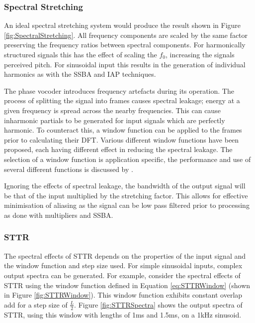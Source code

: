 		\subsubsection*{Spectral Stretching}
			An ideal spectral stretching system would produce the result shown in Figure
			\ref{fig:SpectralStretching}. All frequency components are scaled by the same factor preserving the
			frequency ratios between spectral components. For harmonically structured signals this has the
			effect of scaling the $f_{0}$, increasing the signals perceived pitch. For sinusoidal input this
			results in the generation of individual harmonics as with the SSBA and IAP techniques.
			
			The phase vocoder introduces frequency artefacts during its operation. The process of splitting the
			signal into frames causes spectral leakage; energy at a given frequency is spread across the nearby
			frequencies. This can cause inharmonic partials to be generated for input signals which are
			perfectly harmonic. To counteract this, a window function can be applied to the frames prior to
			calculating their DFT. Various different window functions have been proposed, each having different
			effect in reducing the spectral leakage. The selection of a window function is application
			specific, the performance and use of several different functions is discussed by
			\citet{harris1978on}.
			
			Ignoring the effects of spectral leakage, the bandwidth of the output signal will be that of the
			input multiplied by the stretching factor. This allows for effective minimisation of aliasing as
			the signal can be low pass filtered prior to processing as done with multipliers and SSBA.
		
		\subsubsection*{STTR}
			The spectral effects of STTR depends on the properties of the input signal and the window function
			and step size used. For simple sinusoidal inputs, complex output spectra can be generated. For
			example, consider the spectral effects of STTR using the window function defined in Equation
			\ref{eq:STTRWindow} (shown in Figure \ref{fig:STTRWindow}). This window function exhibits constant
			overlap add for a step size of $\frac{L}{2}$. Figure \ref{fig:STTRSpectra} shows the output spectra
			of STTR, using this window with lengths of 1ms and 1.5ms, on a 1kHz sinusoid.


